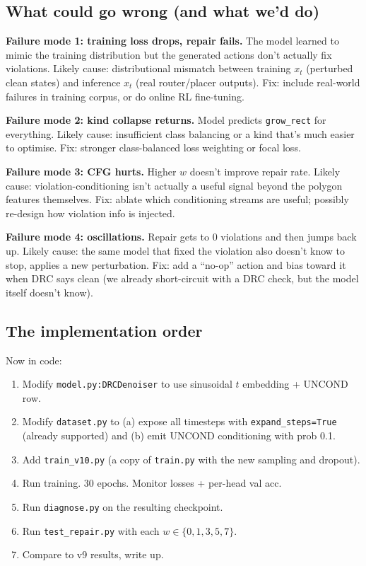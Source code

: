 \documentclass[11pt,a4paper]{article}
\begin{document}
\subsection{What could go wrong (and what we'd do)}

\textbf{Failure mode 1: training loss drops, repair fails.} The model
learned to mimic the training distribution but the generated actions
don't actually fix violations. Likely cause: distributional mismatch
between training $x_t$ (perturbed clean states) and inference $x_t$
(real router/placer outputs). Fix: include real-world failures in
training corpus, or do online RL fine-tuning.

\textbf{Failure mode 2: kind collapse returns.} Model predicts
\verb|grow_rect| for everything. Likely cause: insufficient class
balancing or a kind that's much easier to optimise. Fix: stronger
class-balanced loss weighting or focal loss.

\textbf{Failure mode 3: CFG hurts.} Higher $w$ doesn't improve repair
rate. Likely cause: violation-conditioning isn't actually a useful signal
beyond the polygon features themselves. Fix: ablate which conditioning
streams are useful; possibly re-design how violation info is injected.

\textbf{Failure mode 4: oscillations.} Repair gets to 0 violations and
then jumps back up. Likely cause: the same model that fixed the violation
also doesn't know to stop, applies a new perturbation. Fix: add a
``no-op'' action and bias toward it when DRC says clean (we already
short-circuit with a DRC check, but the model itself doesn't know).

\subsection{The implementation order}

Now in code:
\begin{enumerate}[leftmargin=*]
\item Modify \texttt{model.py:DRCDenoiser} to use sinusoidal $t$
  embedding + UNCOND row.
\item Modify \texttt{dataset.py} to (a) expose all timesteps with
  \verb|expand_steps=True| (already supported) and (b) emit UNCOND
  conditioning with prob 0.1.
\item Add \texttt{train\_v10.py} (a copy of \texttt{train.py} with the
  new sampling and dropout).
\item Run training. 30 epochs. Monitor losses + per-head val acc.
\item Run \texttt{diagnose.py} on the resulting checkpoint.
\item Run \texttt{test\_repair.py} with each $w \in \{0,1,3,5,7\}$.
\item Compare to v9 results, write up.
\end{enumerate}
\end{document}
